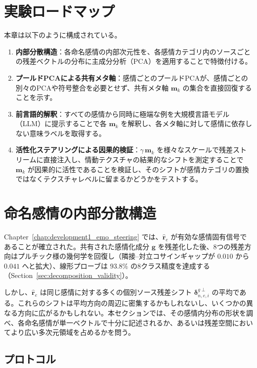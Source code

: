 \section*{実験ロードマップ}

本章は以下のように構成されている。
\begin{enumerate}
  \item \textbf{内部分散構造}：各命名感情の内部次元性を、各感情カテゴリ内のソースごとの残差ベクトルの分布に主成分分析（PCA）を適用することで特徴付ける。
  \item \textbf{プールドPCAによる共有メタ軸}：感情ごとのプールドPCAが、感情ごとの別々のPCAや符号整合を必要とせず、共有メタ軸 $\mathbf{m}_k$ の集合を直接回復することを示す。
  \item \textbf{前言語的解釈}：すべての感情から同時に極端な例を大規模言語モデル（LLM）に提示することで各 $\mathbf{m}_k$ を解釈し、各メタ軸に対して感情に依存しない意味ラベルを取得する。
  \item \textbf{活性化ステアリングによる因果的検証}：$\gamma\,\mathbf{m}_k$ を様々なスケールで残差ストリームに直接注入し、情動テクスチャの結果的なシフトを測定することで $\mathbf{m}_k$ が因果的に活性であることを検証し、そのシフトが感情カテゴリの置換ではなくテクスチャレベルに留まるかどうかをテストする。
\end{enumerate}

\section{命名感情の内部分散構造}
\label{sec:ch2-variance-structure}

Chapter~\ref{chap:development1_emo_steering} では、$\hat{\mathbf{r}}_e$ が有効な感情固有信号であることが確立された。共有された感情化成分 $\mathbf{g}$ を残差化した後、8つの残差方向はプルチック様の幾何学を回復し（隣接--対立コサインギャップが $0.010$ から $0.041$ へと拡大）、線形プローブは $93.8\%$ の8クラス精度を達成する（Section~\ref{sec:decomposition_validity}）。\par

しかし、$\hat{\mathbf{r}}_e$ は同じ感情に対する多くの個別ソース残差シフト $\boldsymbol{\delta}^{g\perp}_{n,e,i}$ の平均である。これらのシフトは平均方向の周辺に密集するかもしれないし、いくつかの異なる方向に広がるかもしれない。本セクションでは、その感情内分布の形状を調べ、各命名感情が単一ベクトルで十分に記述されるか、あるいは残差空間においてより広い多次元領域を占めるかを問う。\par

\subsection*{プロトコル}

